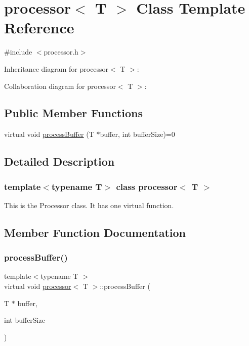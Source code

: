 \hypertarget{classprocessor}{}\section{processor$<$ T $>$ Class Template Reference}
\label{classprocessor}


{\ttfamily \#include $<$processor.\+h$>$}



Inheritance diagram for processor$<$ T $>$\+:


Collaboration diagram for processor$<$ T $>$\+:
\subsection*{Public Member Functions}
\begin{DoxyCompactItemize}
\item 
virtual void \hyperlink{classprocessor_ab23d53c7dd927e50108272ee007dcc29}{process\+Buffer} (T $\ast$buffer, int buffer\+Size)=0
\end{DoxyCompactItemize}


\subsection{Detailed Description}
\subsubsection*{template$<$typename T$>$\newline
class processor$<$ T $>$}

This is the Processor class. It has one virtual function. 

\subsection{Member Function Documentation}
\mbox{\label{classprocessor_ab23d53c7dd927e50108272ee007dcc29}} 
\subsubsection{\texorpdfstring{process\+Buffer()}{processBuffer()}}
{\footnotesize\ttfamily template$<$typename T $>$ \\
virtual void \hyperlink{classprocessor}{processor}$<$ T $>$\+::process\+Buffer (\begin{DoxyParamCaption}\item[{T $\ast$}]{buffer,  }\item[{int}]{buffer\+Size }\end{DoxyParamCaption})\hspace{0.3cm}{\ttfamily [pure virtual]}}



